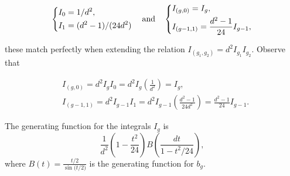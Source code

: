 \documentclass[12pt]{memoir}
\begin{document}
\[
    \left\lbrace
    \begin{aligned}
         & I_0=1/d^2,          \\
         & I_1=(d^2-1)/(24d^2)
    \end{aligned}
    \right.
    \quad\text{and}\quad
    \left\lbrace
    \begin{aligned}
         & I_{(g,0)}=I_g,                       \\
         & I_{(g-1,1)}=\frac{d^2-1}{24}I_{g-1}, \\
    \end{aligned}
    \right.
\]

these match perfectly when extending the relation \(I_{(g_1,g_2)}=d^2I_{g_1}I_{g_2}\). Observe that

\begin{align*}
     & I_{(g,0)}   =d^2I_gI_0=d^2I_g\left(\frac{1}{d^2}\right)=I_g,                                     \\
     & I_{(g-1,1)} =d^2I_{g-1}I_{1}=d^2I_{g-1}\left(\frac{d^2-1}{24d^2}\right)=\frac{d^2-1}{24}I_{g-1}.
\end{align*}

\begin{Th}
    The generating function for the integrals \(I_g\) is
    \[
        \frac{1}{d^2}\left(1-\frac{t^2}{24}\right)B\left(\frac{dt}{1-{t^2}/{24}}\right),
    \]
    where \(B(t)=\frac{t/2}{\sin\bigl(t/2\bigr)}\) is the generating function for \(b_g\).
\end{Th}
\end{document}
